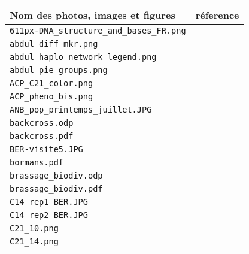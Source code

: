 \begin{center}
\begin{supertabular}{p{.8\textwidth}c}
\hline \textbf{Nom des photos, images et figures} & \textbf{réference} \\ \hline

\texttt{611px-DNA\_structure\_and\_bases\_FR.png} & \cite{611px-DNA_structure_and_bases_FR} \\ \hline

\texttt{abdul\_diff\_mkr.png} & \cite{abdul_diff_mkr} \\ \hline

\texttt{abdul\_haplo\_network\_legend.png} & \cite{abdul_haplo_network_legend} \\ \hline

\texttt{abdul\_pie\_groups.png} & \cite{abdul_pie_groups} \\ \hline

\texttt{ACP\_C21\_color.png} & \cite{ACP_C21_color} \\ \hline

\texttt{ACP\_pheno\_bis.png} & \cite{ACP_pheno_bis} \\ \hline

\texttt{ANB\_pop\_printemps\_juillet.JPG} & \cite{ANB_pop_printemps_juillet} \\ \hline

\texttt{backcross.odp} & \cite{backcross} \\
\texttt{backcross.pdf} & \\ \hline

\texttt{BER-visite5.JPG} & \cite{BER-visite5} \\ \hline

\texttt{bormans.pdf} & \cite{bormans} \\ \hline

\texttt{brassage\_biodiv.odp} & \cite{brassage_biodiv} \\
\texttt{brassage\_biodiv.pdf} & \\ \hline

\texttt{C14\_rep1\_BER.JPG} & \cite{C14_rep1_BER} \\ \hline

\texttt{C14\_rep2\_BER.JPG} & \cite{C14_rep2_BER} \\ \hline

\texttt{C21\_10.png} & \cite{C21_10} \\ \hline

\texttt{C21\_14.png} & \cite{C21_14} \\ \hline


\end{supertabular}
\end{center}
